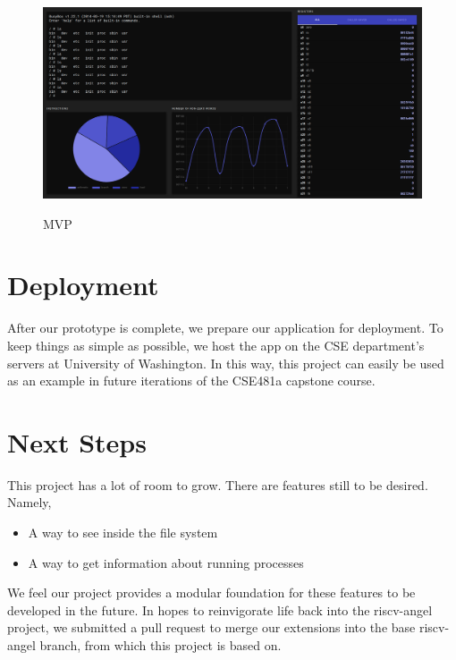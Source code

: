 \begin{figure}[H]
  \includegraphics[scale=0.13]{dashboard}
  \label{fig:mvp}
  \caption{MVP}
  \centering
\end{figure}



\section*{Deployment}

After our prototype is complete, we prepare our application for deployment.
To keep things as simple as possible, we host the app on the
CSE department's servers at University of Washington. In this way, this project
can easily be used as an example in future iterations of the CSE481a capstone course.


\section*{Next Steps}

This project has a lot of room to grow. There are features still to be desired. Namely,

\begin{itemize}
  \item A way to see inside the file system
  \item A way to get information about running processes
\end{itemize}

We feel our project provides a modular foundation for these features to be developed in the future.
In hopes to reinvigorate life back into the riscv-angel project, we submitted a pull request
to merge our extensions into the base riscv-angel branch, from which this project is based on.



